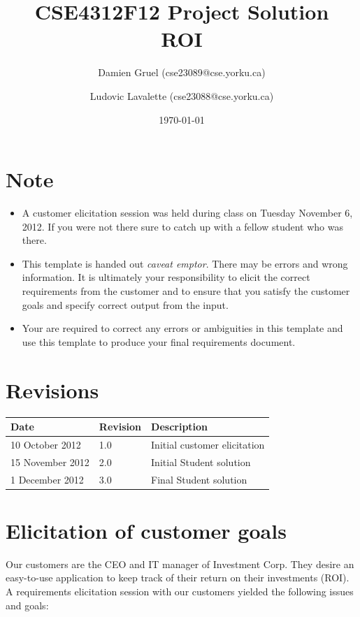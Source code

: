 \documentclass[runningheads,12pt]{article}
\begin{document}
\title{CSE4312F12 Project Solution\\
ROI}

\author{Damien Gruel (cse23089@cse.yorku.ca)
\and Ludovic Lavalette (cse23088@cse.yorku.ca)}

\date{\today}

\maketitle

\section*{Note}
\begin{itemize}
\item A customer elicitation session was held during class on Tuesday November 6, 2012. If you were not there sure to catch up with a fellow student who was there.
\item This template is handed out \emph{caveat emptor}.  There may be errors and wrong information. It is ultimately your responsibility to elicit the correct requirements from the customer and to ensure that you satisfy the customer goals and specify correct output from the input.
\item Your are required to correct any errors or ambiguities in this template and use this template to produce your final requirements document.
\end{itemize}

\section*{Revisions}

\begin{tabular}{|l|l|p{3in}|}
\hline
Date & Revision& Description \\ 
\hline
10 October  2012 
& 1.0       
& Initial customer elicitation\\ 
\hline
15 November 2012
& 2.0       
& Initial Student solution       \\
\hline
1 December 2012
& 3.0       
& Final Student solution       \\
\hline
\end{tabular}

\newpage
\tableofcontents
\listoffigures
\listoftables

\newpage

\section{Elicitation of customer goals}
Our customers are the CEO and IT manager of Investment Corp. They desire an easy-to-use application to keep track of their return on their investments (ROI). A requirements elicitation session with our customers yielded the following issues and goals:
\end{document}
